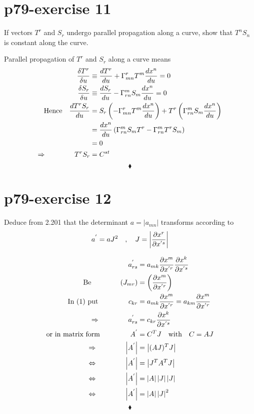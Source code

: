\section{p79-exercise 11}
\begin{tcolorbox}
If vectors $T^r$ and $S_r$ undergo parallel propagation along a curve, show that $T^nS_n$ is constant along the curve.
\end{tcolorbox}
Parallel propagation of $T^r$ and $S_r$  along a curve means
\begin{align*}
\frac{\delta T^r}{\delta u} &\equiv \dv{T^r}{u} + \Gamma^r_{mn}T^m \dv{x^n}{u} = 0\\
\frac{\delta S_r}{\delta u} &\equiv \dv{S_r}{u} - \Gamma^m_{rn}S_m \dv{x^n}{u} = 0\\
\text{Hence}\quad \dv{T^rS_r}{u} &= S_r\left(-\Gamma^r_{mn}T^m\dv{x^n}{u}\right) + T^r\left(\Gamma^m_{rn}S_m \dv{x^n}{u} \right)\\
\ &= \dv{x^n}{u}\left(\Gamma^m_{rn}S_mT^r -  \Gamma^m_{rn}T^rS_m\right)\\
\ &=0\\
\Rightarrow \quad\quad\quad\quad T^rS_r &= C^{st}
\end{align*} 
$$\blacklozenge$$
\newpage

\section{p79-exercise 12}
\begin{tcolorbox}
Deduce from 2.201 that the determinant $a= \left | a_{mn} \right |$ transforms according to $$a^{'} = aJ^2 \quad , \quad J = \left | \pdv{x^r}{x^{'s}}\right|$$
\end{tcolorbox}
\begin{align}
\ a^{'}_{rs} &= a_{mk} \pdv{x^{m}}{x^{'r}} \pdv{x^{k}}{x^{'s}}\\
\text{Be}\quad\quad\quad\quad \left(J_{mr} \right )&= \left (\pdv{x^{m}}{x^{'r}}\right )\\
\text{In (1) put  }\quad\quad\quad\quad c_{kr} &= a_{mk} \pdv{x^{m}}{x^{'r}}= a_{km} \pdv{x^{m}}{x^{'r}} \\
\Rightarrow\quad\quad\quad\quad a^{'}_{rs} &= c_{kr} \pdv{x^{k}}{x^{'s}}\\
\text{or in matrix form  } \quad\quad\quad\quad A^{'} &= C^T J\quad \text{with}\quad C = AJ\\
\Rightarrow\quad\quad\quad\quad \left |A^{'} \right| &= \left | (AJ)^T J\right |\\
\Leftrightarrow\quad\quad\quad\quad \left |A^{'} \right| &= \left | J^T A^T J\right |\\
\Leftrightarrow\quad\quad\quad\quad \left |A^{'} \right| &= \left | A\right | \left |J\right |\left |J\right |\\
\Leftrightarrow\quad\quad\quad\quad \left |A^{'} \right| &= \left | A\right | \left |J\right | ^2
\end{align}
$$\blacklozenge$$
\newpage


